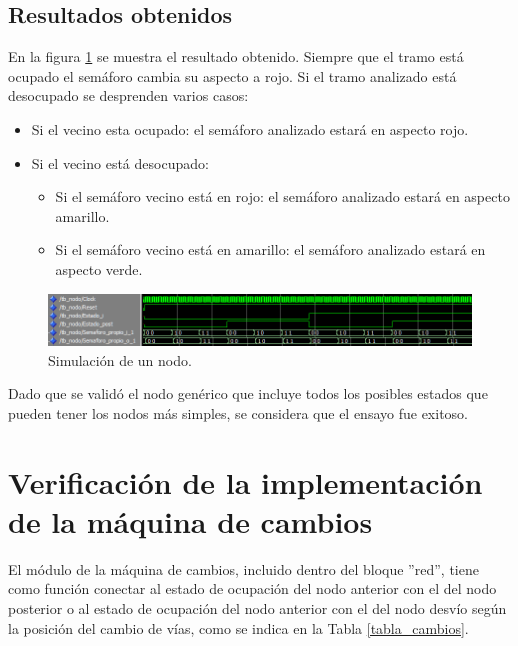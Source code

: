		\subsection{Resultados obtenidos}
			
			En la figura \ref{fig:Test_Nodo} se muestra el resultado obtenido. Siempre que el tramo está ocupado el semáforo cambia su aspecto a rojo. Si el tramo analizado está desocupado se desprenden varios casos:
			
			\begin{itemize}
				\item Si el vecino esta ocupado: el semáforo analizado estará en aspecto rojo.
				\item Si el vecino está desocupado:
				\begin{itemize}
					\item Si el semáforo vecino está en rojo: el semáforo analizado estará en aspecto amarillo.
					\item Si el semáforo vecino está en amarillo:  el semáforo analizado estará en aspecto verde.
				\end{itemize}				 
			\end{itemize}
			
			\begin{figure}[h]
			\centering
			\includegraphics[scale=0.6]{./Figures/Test/Nodo}
				\caption{Simulación de un nodo.}
				\label{fig:Test_Nodo}
			\end{figure}
				
			Dado que se validó el nodo genérico que incluye todos los posibles estados que pueden tener los nodos más simples, se considera que el ensayo fue exitoso.	
	
\section{Verificación de la implementación de la máquina de cambios}

	El módulo de la máquina de cambios, incluido dentro del bloque ''red'', tiene como función conectar al estado de ocupación del nodo anterior con el del nodo posterior o al estado de ocupación del nodo anterior con el del nodo desvío según la posición del cambio de vías, como se indica en la Tabla \ref{tabla_cambios}.
	
